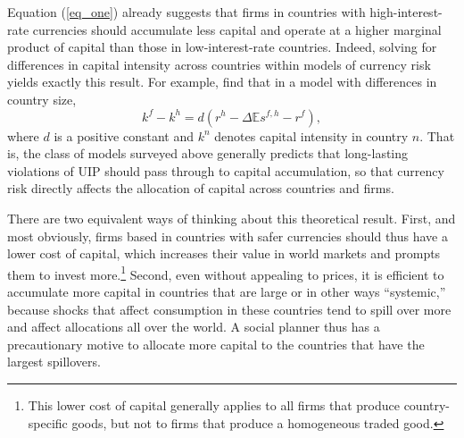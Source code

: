 \documentclass{ar-1col}
\begin{document}
Equation (\ref{eq_one}) already suggests that firms in countries with high-interest-rate currencies should accumulate less capital and operate at a higher marginal product of capital than those in low-interest-rate countries. Indeed, solving for differences in capital intensity across countries within models of currency risk yields exactly this result. For example, \citet{HassanMertensZhang2015} find that in a model with differences in country size,  
\begin{equation}
    k^f - k^h = d
    \left(r^h - \Delta \mathbb{E} s^{f, h} - r^f \right),
\end{equation}
where $d$ is a positive constant and $k^n$ denotes capital intensity in country $n$. That is, the class of models surveyed above generally predicts that long-lasting violations of UIP should pass through to capital accumulation, so that currency risk directly affects the allocation of capital across countries and firms.

There are two equivalent ways of thinking about this theoretical result. First, and most obviously, firms based in countries with safer currencies should thus have a lower cost of capital, which increases their value in world markets and prompts them to
invest more.\footnote{This lower cost of capital generally applies to all firms that produce country-specific goods, but not to firms that produce a homogeneous traded good.} 
Second, even without appealing to prices, it is efficient to accumulate more capital in countries that are large or in other ways ``systemic,'' because shocks that affect consumption in these countries tend to spill over more and affect allocations all over the world. A social planner thus has a precautionary motive to allocate more capital to the countries that have the largest spillovers.

\end{document}
